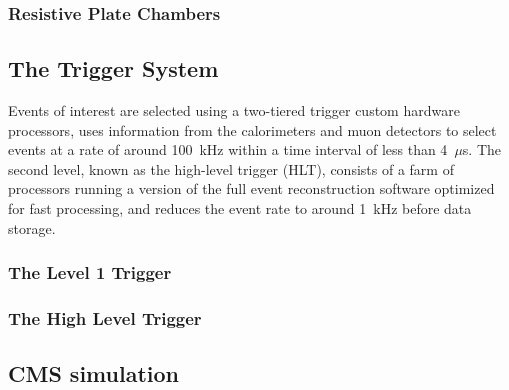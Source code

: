 \subsubsection{Resistive Plate Chambers}
\subsection{The Trigger System}
Events of interest are selected using a two-tiered trigger
custom hardware processors, uses information from the calorimeters and
muon detectors to select events at a rate of around 100~kHz
within a time interval of less than 4~$\mu$s. The second level, known as
the high-level trigger (HLT), consists of a farm of processors running
a version of the full event reconstruction software optimized for fast
processing, and reduces the event rate to around 1~kHz before
data storage.
\subsubsection{The Level 1 Trigger}
\subsubsection{The High Level Trigger}
\subsection{CMS simulation}
